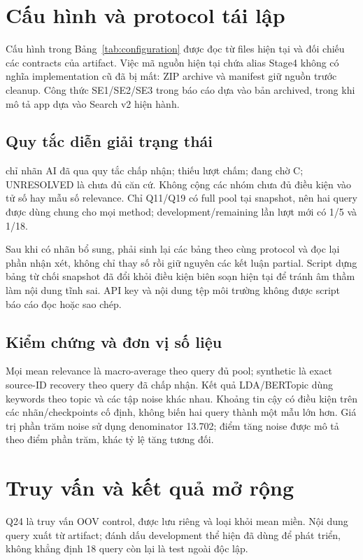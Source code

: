 \chapter{Cấu hình và protocol tái lập}\label{app:config}

Cấu hình trong Bảng~\ref{tab:configuration} được đọc từ files hiện tại và đối chiếu các contracts của artifact. Việc mã nguồn hiện tại chứa alias Stage4 không có nghĩa implementation cũ đã bị mất: ZIP archive và manifest giữ nguồn trước cleanup. Công thức SE1/SE2/SE3 trong báo cáo dựa vào bản archived, trong khi mô tả app dựa vào Search v2 hiện hành.

\section{Quy tắc diễn giải trạng thái}
 chỉ nhãn AI đã qua quy tắc chấp nhận;  thiếu lượt chấm;  đang chờ C; UNRESOLVED là chưa đủ căn cứ. Không cộng các nhóm chưa đủ điều kiện vào tử số hay mẫu số relevance. Chỉ Q11/Q19 có full pool tại snapshot, nên hai query được dùng chung cho mọi method; development/remaining lần lượt mới có 1/5 và 1/18.

Sau khi có nhãn bổ sung, phải sinh lại các bảng theo cùng protocol và đọc lại phần nhận xét, không chỉ thay số rồi giữ nguyên các kết luận partial. Script dựng bảng từ chối snapshot đã đổi khỏi điều kiện biên soạn hiện tại để tránh âm thầm làm nội dung tĩnh sai. API key và nội dung tệp môi trường không được script báo cáo đọc hoặc sao chép.

\section{Kiểm chứng và đơn vị số liệu}
Mọi mean relevance là macro-average theo query đủ pool; synthetic là exact source-ID recovery theo query đã chấp nhận. Kết quả LDA/BERTopic dùng keywords theo topic và các tập noise khác nhau. Khoảng tin cậy có điều kiện trên các nhãn/checkpoints cố định, không biến hai query thành một mẫu lớn hơn. Giá trị phần trăm noise sử dụng denominator 13.702; điểm tăng noise được mô tả theo điểm phần trăm, khác tỷ lệ tăng tương đối.

\chapter{Truy vấn và kết quả mở rộng}\label{app:queries}

Q24 là truy vấn OOV control, được lưu riêng và loại khỏi mean miền. Nội dung query xuất từ artifact; đánh dấu development thể hiện đã dùng để phát triển, không khẳng định 18 query còn lại là test ngoài độc lập.



